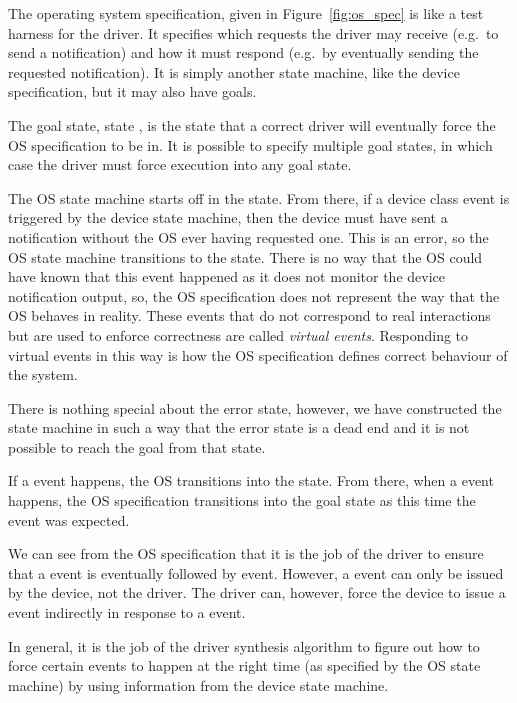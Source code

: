 The operating system specification, given in Figure~\ref{fig:os_spec} is like a test harness for the driver. It specifies which requests the driver may receive (e.g.\ to send a notification) and how it must respond (e.g.\ by eventually sending the requested notification). It is simply another state machine, like the device specification, but it may also have goals.

The goal state, state , is the state that a correct driver will eventually force the OS specification to be in. It is possible to specify multiple goal states, in which case the driver must force execution into any goal state.

The OS state machine starts off in the  state. From there, if a  device class event is triggered by the device state machine, then the device must have sent a notification without the OS ever having requested one. This is an error, so the OS state machine transitions to the  state. There is no way that the OS could have known that this event happened as it does not monitor the device notification output, so, the OS specification does not represent the way that the OS behaves in reality. These events that do not correspond to real interactions but are used to enforce correctness are called \emph{virtual events}. Responding to virtual events in this way is how the OS specification defines correct behaviour of the system.

There is nothing special about the error state, however, we have constructed the state machine in such a way that the error state is a dead end and it is not possible to reach the goal from that state.

If a  event happens, the OS transitions into the  state. From there, when a  event happens, the OS specification transitions into the goal state as this time the  event was expected. 

We can see from the OS specification that it is the job of the driver to ensure that a  event is eventually followed by  event. However, a  event can only be issued by the device, not the driver. The driver can, however, force the device to issue a  event indirectly in response to a  event. 

In general, it is the job of the driver synthesis algorithm to figure out how to force certain events to happen at the right time (as specified by the OS state machine) by using information from the device state machine. 

